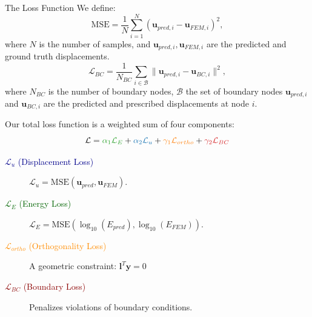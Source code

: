 \documentclass[9pt]{beamer}
\begin{document}
\begin{frame}[allowframebreaks]{The Loss Function}
    We define:
    \begin{equation*}
        \text{MSE} = \frac{1}{N} \sum_{i=1}^{N} (\bm{u}_{pred,i} - \bm{u}_{FEM,i})^2,
    \end{equation*}
     where \(N\) is the number of samples, and \(\bm{u}_{pred,i}, \bm{u}_{FEM,i}\) are the predicted and ground truth displacements.
    \begin{equation*}
    \mathcal{L}_{BC} = \frac{1}{N_{BC}} \sum_{i \in \mathcal{B}} \|\bm{u}_{pred,i} - \bm{u}_{BC,i}\|^2,
    \end{equation*}
    where \(N_{BC}\) is the number of boundary nodes, \(\mathcal{B}\) the set of boundary nodes \(\bm{u}_{pred,i}\) and \(\bm{u}_{BC,i}\) are the predicted and prescribed displacements at node \(i\).
    \vspace{7em}

    Our total loss function is a weighted sum of four components:
     \begin{equation*}
          \mathcal{L} = \textcolor{darkgreen}{\alpha_1 \mathcal{L}_E} + \textcolor{darkblue}{\alpha_2 \mathcal{L}_u} + \textcolor{darkorange}{\gamma_1 \mathcal{L}_{ortho}} + \textcolor{darkred}{\gamma_2 \mathcal{L}_{BC}}
     \end{equation*}
    \begin{description}
          \item[\textcolor{darkblue}{\(\mathcal{L}_u\) (Displacement Loss)}]
        \(\mathcal{L}_u = \text{MSE}(\bm{u}_{pred}, \bm{u}_{FEM})\).
          
          \item[\textcolor{darkgreen}{\(\mathcal{L}_E\) (Energy Loss)}] 
        \(\mathcal{L}_E = \text{MSE}(\log_{10}(E_{pred}), \log_{10}(E_{FEM})).\)
          
          \item[\textcolor{darkorange}{\(\mathcal{L}_{ortho}\) (Orthogonality Loss)}] A geometric constraint:
          \(
                \bm{l}^T \bm{y} = 0
          \)
          
          \item[\textcolor{darkred}{\(\mathcal{L}_{BC}\) (Boundary Loss)}] Penalizes violations of boundary conditions.
     \end{description}
     
\end{frame}

    
\end{document}
